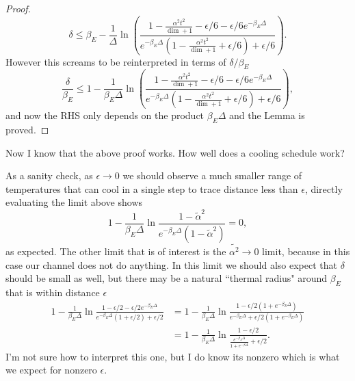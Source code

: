 \documentclass{article}
\begin{document}
\begin{proof}
\begin{equation}
    \delta \le \beta_E - \frac{1}{\Delta}  \ln \left( \frac{1 - \frac{\alpha^2 t^2}{\dim + 1} - \epsilon/ 6 - \epsilon/6 e^{-\beta_E \Delta}}{e^{-\beta_E \Delta}(1 - \frac{\alpha^2 t^2}{\dim + 1} + \epsilon/6) + \epsilon / 6} \right).
\end{equation}
However this screams to be reinterpreted in terms of $\delta / \beta_E$
\begin{equation}
    \frac{\delta}{\beta_E} \le 1 - \frac{1}{\beta_E \Delta}  \ln \left( \frac{1 - \frac{\alpha^2 t^2}{\dim + 1} - \epsilon/ 6 - \epsilon/6 e^{-\beta_E \Delta}}{e^{-\beta_E \Delta}(1 - \frac{\alpha^2 t^2}{\dim + 1} + \epsilon/6) + \epsilon / 6} \right),
\end{equation}
and now the RHS only depends on the product $\beta_E \Delta$ and the Lemma is proved.
\end{proof}

Now I know that the above proof works. How well does a cooling schedule work?


As a sanity check, as $\epsilon \to 0$ we should observe a much smaller range of temperatures that can cool in a single step to trace distance less than $\epsilon$, directly evaluating the limit above shows
\begin{equation}
    1 - \frac{1}{\beta_E \Delta} \ln \frac{1 - \widetilde{\alpha}^2}{e^{-\beta_E \Delta} (1 - \widetilde{\alpha}^2)} = 0,
\end{equation}
as expected. The other limit that is of interest is the $\widetilde{\alpha^2} \to 0$ limit, because in this case our channel does not do anything. In this limit we should also expect that $\delta$ should be small as well, but there may be a natural ``thermal radius" around $\beta_E$ that is within distance $\epsilon$
\begin{align}
    1 - \frac{1}{\beta_E \Delta} \ln \frac{1 - \epsilon /2 - \epsilon / 2 e^{-\beta_E \Delta}}{e^{-\beta_E \Delta}(1 + \epsilon / 2) + \epsilon/ 2} &= 1 - \frac{1}{\beta_E \Delta} \ln \frac{1 - \epsilon /2(1 + e^{-\beta_E \Delta})}{e^{-\beta_E \Delta} + \epsilon/ 2(1 + e^{-\beta_E \Delta}) }\\
    &= 1 - \frac{1}{\beta_E \Delta} \ln \frac{1 - \epsilon /2}{\frac{e^{-\beta_E \Delta}}{1 +e^{-\beta \Delta}} + \epsilon/ 2 }.
\end{align}
I'm not sure how to interpret this one, but I do know its nonzero which is what we expect for nonzero $\epsilon$.
\end{document}
